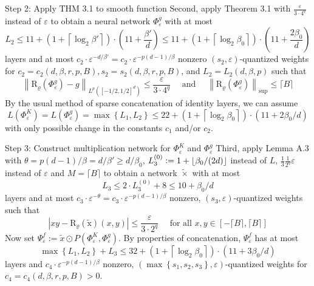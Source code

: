 \documentclass{if-beamer}
\newcommand{\defeq}{\vcentcolon=}
\begin{document}
\begin{frame}{Step 2: Apply THM 3.1 to smooth function}
    Second, apply Theorem 3.1 with $\frac{\varepsilon}{3\cdot 4^q}$ instead of $\varepsilon$ to obtain a neural network $\Phi_{\varepsilon}^{g}$ with at most $$L_2 \leq 11 + \left(1+\left\lceil\log _{2} \beta'\right\rceil\right) \cdot(11+\frac{\beta'}{d}) \leq 11 + \left(1+\left\lceil\log _{2} \beta_0\right\rceil\right) \cdot(11+\frac{2\beta_0}{d})$$ layers and at most $c_2\cdot \varepsilon^{-d/\beta'} = c_2\cdot \varepsilon^{-p(d-1)/\beta}$ nonzero $(s_2,\varepsilon)$-quantized weights for $c_2=c_2(d,\beta,r,p,B), s_2=s_2(d,\beta,r,p,B)$, and $L_2=L_2(d,\beta,p)$ such that
    {\small
    $$
    \left\|\mathrm{R}_{\varrho}\left(\Phi_{\varepsilon}^{g}\right)-g\right\|_{L^{p}\left([-1 / 2,1 / 2]^{d}\right)} \leq \frac{\varepsilon}{3 \cdot 4^{q}} \quad \text { and } \quad\left\|\mathrm{R}_{\varrho}\left(\Phi_{\varepsilon}^{g}\right)\right\|_{\mathrm{sup}} \leq\lceil B\rceil
    $$
    }%
    By the usual method of sparse concatenation of identity layers, we can assume $$L(\Phi_{\varepsilon}^{K})=L(\Phi_{\varepsilon}^{g})=\max \left\{L_{1}, L_{2}\right\} \leq 22+\left(1+\left\lceil\log _{2} \beta_{0}\right\rceil\right) \cdot\left(11+2 \beta_{0} / d\right)$$
    with only possible change in the constants $c_1$ and/or $c_2$.
\end{frame}

\begin{frame}{Step 3: Construct multiplication network for $\Phi_{\varepsilon}^{K}$ and $\Phi_{\varepsilon}^{g}$}
    Third, apply Lemma A.3 with $\theta = p(d-1)/\beta = d/\beta' \geq d/\beta_0$, $L_3^{(0)} \defeq 1+\lfloor\beta_0/(2d) \rfloor$ instead of $L$, $\frac{1}{3}\frac{1}{2^q}\varepsilon$ instead of $\varepsilon$ and $M=\lceil B \rceil$ to obtain a network $\widetilde{\times}$ with at most 
    $$L_3 \leq 2 \cdot L_3^{(0)} + 8 \leq 10 + \beta_0/d $$
    layers and at most $c_3\cdot\varepsilon^{-\theta}=c_3\cdot\varepsilon^{-p(d-1)/\beta}$ nonzero, $(s_3,\varepsilon)$-quantized weights such that
    $$\left|x y-\mathrm{R}_{\varrho}(\widetilde{\mathrm{x}})(x, y)\right| \leq \frac{\varepsilon}{3 \cdot 2^{q}} \quad \text { for all } x, y \in[-\lceil B\rceil,\lceil B\rceil]
    $$
    Now set $\Psi_{\varepsilon}^{f}:=\widetilde{x} \odot P\left(\Phi_{\varepsilon}^{K}, \Phi_{\varepsilon}^{g}\right) .$ By properties of concatenation, $\Psi_{\varepsilon}^{f}$ has at most
    $$
    \max \left\{L_{1}, L_{2}\right\}+L_{3} \leq 32+\left(1+\left\lceil\log _{2} \beta_{0}\right\rceil\right) \cdot\left(11+3 \beta_{0} / d\right)
    $$
    layers and $c_{4} \cdot \varepsilon^{-p(d-1) / \beta}$ nonzero, $\left(\max \left\{s_{1}, s_{2}, s_{3}\right\}, \varepsilon\right)$-quantized weights for $c_{4}=c_{4}(d, \beta, r, p, B)>0$.
\end{frame}
\end{document}

